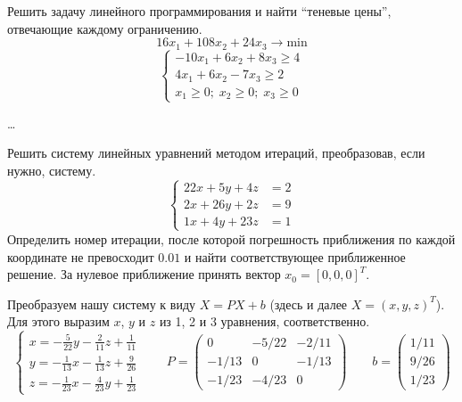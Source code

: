 \begin{problem}
    Решить задачу линейного программирования и найти ``теневые цены'', отвечающие
    каждому ограничению.
    \begin{equation*}
        16x_1 + 108x_2 + 24x_3 \to \text{min}
    \end{equation*}
    \begin{equation*}
        \begin{cases}
            -10x_1 + 6x_2 + 8x_3 \geq 4\\
            4x_1 + 6x_2 - 7x_3 \geq 2\\
            x_1 \geq 0; \; x_2 \geq 0; \; x_3 \geq 0
        \end{cases}
    \end{equation*}
\end{problem}

\ldots


\begin{problem}
    Решить систему линейных уравнений методом итераций, преобразовав, если
    нужно, систему.
    \begin{equation*}
        \begin{cases}
            22x + 5y + 4z &= 2\\
            2x + 26y + 2z &= 9\\
            1x + 4y + 23z &= 1
        \end{cases}
    \end{equation*}
    Определить номер итерации, после которой погрешность приближения по каждой
    координате не превосходит $0.01$ и найти соответствующее приближенное
    решение. За нулевое приближение принять вектор $x_0 = [0, 0, 0]^T$.
\end{problem}

Преобразуем нашу систему к виду $X = PX + b$ (здесь и далее $X = (x, y, z)^T$).
Для этого выразим $x$, $y$ и $z$ из 1, 2 и 3 уравнения, соответственно.
\begin{equation*}
    \begin{cases}
        x = -\frac{5}{22}y - \frac{2}{11}z + \frac{1}{11}\\
        y = -\frac{1}{13}x - \frac{1}{13}z + \frac{9}{26}\\
        z = -\frac{1}{23}x - \frac{4}{23}y + \frac{1}{23}
    \end{cases}
    \qquad
    P = \begin{pmatrix}
        0 & -{5/22} & -{2/11}\\
        -{1/13} & 0 & -{1/13}\\
        -{1/23} & -{4/23} & 0
    \end{pmatrix}
    \qquad
    b = \begin{pmatrix}
        {1/11}\\
        {9/26}\\
        {1/23}
    \end{pmatrix}
\end{equation*}

